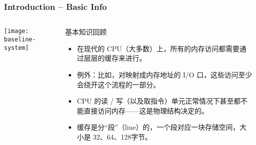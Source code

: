 %
%
\begin{frame}[plain]
	\frametitle{Introduction -- Basic Info}
	\begin{columns}
		\begin{column}{.4\textwidth}
			\centering
			
			\texttt{[image: baseline-system]}
		\end{column}
		\begin{column}{.6\textwidth}
		基本知识回顾
			\begin{itemize}
				\item 在现代的 CPU（大多数）上，所有的内存访问都需要通过层层的缓存来进行。
				\item 例外：比如，对映射成内存地址的 I/O 口，这些访问至少会绕开这个流程的一部分。
				\item CPU 的读 / 写（以及取指令）单元正常情况下甚至都不能直接访问内存——这是物理结构决定的。
				\item 缓存是分“段”（line）的，一个段对应一块存储空间，大小是 32、64、128字节。
			\end{itemize}
			
		\end{column}
	\end{columns}
	
\end{frame}

